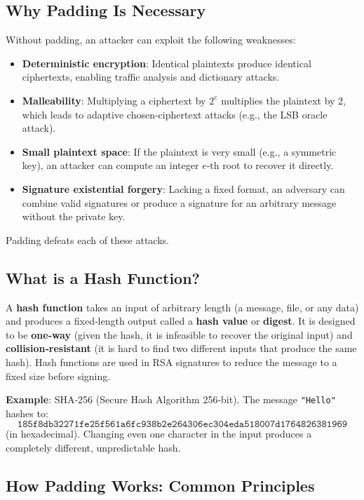 \subsection{Why Padding Is Necessary}

Without padding, an attacker can exploit the following weaknesses:
\begin{itemize}
\item \textbf{Deterministic encryption}: Identical plaintexts produce identical ciphertexts, enabling traffic analysis and dictionary attacks.
\item \textbf{Malleability}: Multiplying a ciphertext by \(2^e\) multiplies the plaintext by 2, which leads to adaptive chosen‑ciphertext attacks (e.g., the LSB oracle attack).
\item \textbf{Small plaintext space}: If the plaintext is very small (e.g., a symmetric key), an attacker can compute an integer \(e\)-th root to recover it directly.
\item \textbf{Signature existential forgery}: Lacking a fixed format, an adversary can combine valid signatures or produce a signature for an arbitrary message without the private key.
\end{itemize}
Padding defeats each of these attacks.

\subsection{What is a Hash Function?}

A \textbf{hash function} takes an input of arbitrary length (a message, file, or any data) and produces a fixed‑length output called a \textbf{hash value} or \textbf{digest}. It is designed to be \textbf{one‑way} (given the hash, it is infeasible to recover the original input) and \textbf{collision‑resistant} (it is hard to find two different inputs that produce the same hash). Hash functions are used in RSA signatures to reduce the message to a fixed size before signing.

\noindent\textbf{Example}: SHA‑256 (Secure Hash Algorithm 256‑bit). The message \texttt{"Hello"} hashes to:
\[
\texttt{185f8db32271fe25f561a6fc938b2e264306ec304eda518007d1764826381969}
\]
(in hexadecimal). Changing even one character in the input produces a completely different, unpredictable hash.

\subsection{How Padding Works: Common Principles}

